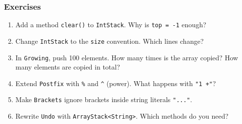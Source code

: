 \documentclass[aspectratio=169,10pt,compress]{beamer}
\begin{document}
\begin{frame}[t,fragile] \frametitle{Exercises}
  \begin{enumerate}\small
    \item Add a method \texttt{clear()} to \texttt{IntStack}. Why is \texttt{top = -1} enough?
    \item Change \texttt{IntStack} to the \texttt{size} convention. Which lines change?
    \item In \texttt{Growing}, push 100 elements. How many times is the array copied? How many elements are copied in total?
    \item Extend \texttt{Postfix} with \texttt{\%} and \texttt{\textasciicircum} (power). What happens with \texttt{"1 +"}?
    \item Make \texttt{Brackets} ignore brackets inside string literals \texttt{"..."}.
    \item Rewrite \texttt{Undo} with \texttt{ArrayStack<String>}. Which methods do you need?
  \end{enumerate}
\end{frame}




\begin{frame}[t,fragile]
	\begin{center}
		\vspace{4cm}
	\end{center}
\end{frame}
\end{document}
